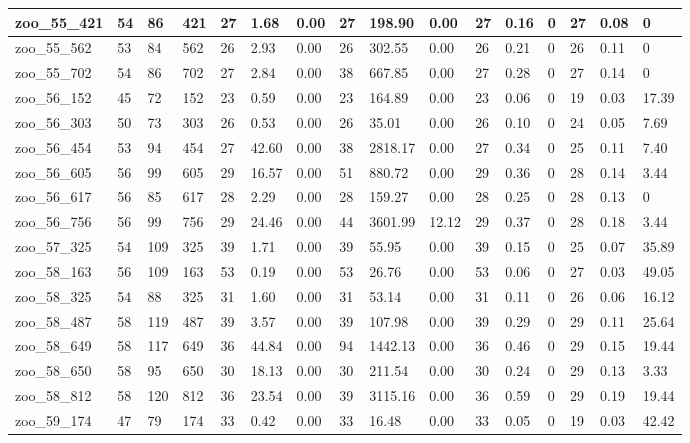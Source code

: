 \begin{landscape}
\begin{longtable}{llllllllllllllll}
zoo\_55\_421 & 54 & 86 & 421 & 27 & 1.68 & 0.00 & 27 & 198.90 & 0.00 & 27 & 0.16 & 0 & 27 & 0.08 & 0 \\ \hline 
zoo\_55\_562 & 53 & 84 & 562 & 26 & 2.93 & 0.00 & 26 & 302.55 & 0.00 & 26 & 0.21 & 0 & 26 & 0.11 & 0 \\ \hline 
zoo\_55\_702 & 54 & 86 & 702 & 27 & 2.84 & 0.00 & 38 & 667.85 & 0.00 & 27 & 0.28 & 0 & 27 & 0.14 & 0 \\ \hline 
zoo\_56\_152 & 45 & 72 & 152 & 23 & 0.59 & 0.00 & 23 & 164.89 & 0.00 & 23 & 0.06 & 0 & 19 & 0.03 & 17.39 \\ \hline 
zoo\_56\_303 & 50 & 73 & 303 & 26 & 0.53 & 0.00 & 26 & 35.01 & 0.00 & 26 & 0.10 & 0 & 24 & 0.05 & 7.69 \\ \hline 
zoo\_56\_454 & 53 & 94 & 454 & 27 & 42.60 & 0.00 & 38 & 2818.17 & 0.00 & 27 & 0.34 & 0 & 25 & 0.11 & 7.40 \\ \hline 
zoo\_56\_605 & 56 & 99 & 605 & 29 & 16.57 & 0.00 & 51 & 880.72 & 0.00 & 29 & 0.36 & 0 & 28 & 0.14 & 3.44 \\ \hline 
zoo\_56\_617 & 56 & 85 & 617 & 28 & 2.29 & 0.00 & 28 & 159.27 & 0.00 & 28 & 0.25 & 0 & 28 & 0.13 & 0 \\ \hline 
zoo\_56\_756 & 56 & 99 & 756 & 29 & 24.46 & 0.00 & 44 & 3601.99 & 12.12 & 29 & 0.37 & 0 & 28 & 0.18 & 3.44 \\ \hline 
zoo\_57\_325 & 54 & 109 & 325 & 39 & 1.71 & 0.00 & 39 & 55.95 & 0.00 & 39 & 0.15 & 0 & 25 & 0.07 & 35.89 \\ \hline 
zoo\_58\_163 & 56 & 109 & 163 & 53 & 0.19 & 0.00 & 53 & 26.76 & 0.00 & 53 & 0.06 & 0 & 27 & 0.03 & 49.05 \\ \hline 
zoo\_58\_325 & 54 & 88 & 325 & 31 & 1.60 & 0.00 & 31 & 53.14 & 0.00 & 31 & 0.11 & 0 & 26 & 0.06 & 16.12 \\ \hline 
zoo\_58\_487 & 58 & 119 & 487 & 39 & 3.57 & 0.00 & 39 & 107.98 & 0.00 & 39 & 0.29 & 0 & 29 & 0.11 & 25.64 \\ \hline 
zoo\_58\_649 & 58 & 117 & 649 & 36 & 44.84 & 0.00 & 94 & 1442.13 & 0.00 & 36 & 0.46 & 0 & 29 & 0.15 & 19.44 \\ \hline 
zoo\_58\_650 & 58 & 95 & 650 & 30 & 18.13 & 0.00 & 30 & 211.54 & 0.00 & 30 & 0.24 & 0 & 29 & 0.13 & 3.33 \\ \hline 
zoo\_58\_812 & 58 & 120 & 812 & 36 & 23.54 & 0.00 & 39 & 3115.16 & 0.00 & 36 & 0.59 & 0 & 29 & 0.19 & 19.44 \\ \hline 
zoo\_59\_174 & 47 & 79 & 174 & 33 & 0.42 & 0.00 & 33 & 16.48 & 0.00 & 33 & 0.05 & 0 & 19 & 0.03 & 42.42 \\ \hline 

\end{longtable}
\end{landscape}
